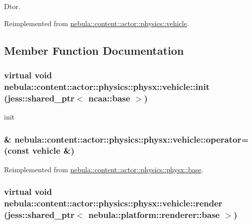 Dtor. 

Reimplemented from \hyperlink{classnebula_1_1content_1_1actor_1_1physics_1_1vehicle_aaea3f60e22369bf24ebc74746397bf0b}{nebula::content::actor::physics::vehicle}.

\subsection{Member Function Documentation}
\hypertarget{classnebula_1_1content_1_1actor_1_1physics_1_1physx_1_1vehicle_a5a02b3b91000246214cc333335e41615}{
\subsubsection[{init}]{\setlength{\rightskip}{0pt plus 5cm}virtual void nebula::content::actor::physics::physx::vehicle::init (jess::shared\_\-ptr$<$ {\bf ncaa::base} $>$)}}
\label{classnebula_1_1content_1_1actor_1_1physics_1_1physx_1_1vehicle_a5a02b3b91000246214cc333335e41615}


init \hypertarget{classnebula_1_1content_1_1actor_1_1physics_1_1physx_1_1vehicle_a84650bfdbbff5bb3bb98cd049738531b}{
\subsubsection[{operator=}]{\& nebula::content::actor::physics::physx::vehicle::operator= (const {\bf vehicle} \&)}}
\label{classnebula_1_1content_1_1actor_1_1physics_1_1physx_1_1vehicle_a84650bfdbbff5bb3bb98cd049738531b}


Reimplemented from \hyperlink{classnebula_1_1content_1_1actor_1_1physics_1_1physx_1_1base_a0e06604de753b8803bf4364ab967d23d}{nebula::content::actor::physics::physx::base}.\hypertarget{classnebula_1_1content_1_1actor_1_1physics_1_1physx_1_1vehicle_a0a381c03558fdce4620e5bd602a1c4b7}{
\subsubsection[{render}]{\setlength{\rightskip}{0pt plus 5cm}virtual void nebula::content::actor::physics::physx::vehicle::render (jess::shared\_\-ptr$<$ {\bf nebula::platform::renderer::base} $>$)}}
\label{classnebula_1_1content_1_1actor_1_1physics_1_1physx_1_1vehicle_a0a381c03558fdce4620e5bd602a1c4b7}


